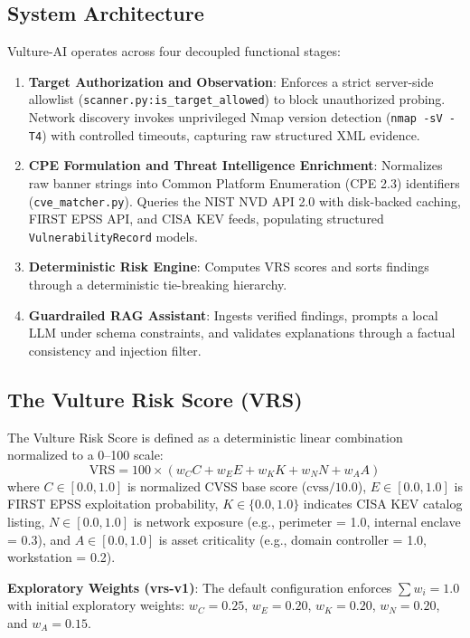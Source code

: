 \documentclass[conference]{IEEEtran}
\begin{document}
\subsection{System Architecture}
Vulture-AI operates across four decoupled functional stages:
\begin{enumerate}
    \item \textbf{Target Authorization and Observation}: Enforces a strict server-side allowlist (\texttt{scanner.py:is\_target\_allowed}) to block unauthorized probing. Network discovery invokes unprivileged Nmap version detection (\texttt{nmap -sV -T4}) with controlled timeouts, capturing raw structured XML evidence.
    \item \textbf{CPE Formulation and Threat Intelligence Enrichment}: Normalizes raw banner strings into Common Platform Enumeration (CPE 2.3) identifiers (\texttt{cve\_matcher.py}). Queries the NIST NVD API 2.0 with disk-backed caching, FIRST EPSS API, and CISA KEV feeds, populating structured \texttt{VulnerabilityRecord} models.
    \item \textbf{Deterministic Risk Engine}: Computes VRS scores and sorts findings through a deterministic tie-breaking hierarchy.
    \item \textbf{Guardrailed RAG Assistant}: Ingests verified findings, prompts a local LLM under schema constraints, and validates explanations through a factual consistency and injection filter.
\end{enumerate}

\subsection{The Vulture Risk Score (VRS)}
The Vulture Risk Score is defined as a deterministic linear combination normalized to a 0--100 scale:
\begin{equation}
\text{VRS} = 100 \times \left( w_C C + w_E E + w_K K + w_N N + w_A A \right)
\label{eq:vrs}
\end{equation}
where $C \in [0.0, 1.0]$ is normalized CVSS base score ($\text{cvss} / 10.0$), $E \in [0.0, 1.0]$ is FIRST EPSS exploitation probability, $K \in \{0.0, 1.0\}$ indicates CISA KEV catalog listing, $N \in [0.0, 1.0]$ is network exposure (e.g., perimeter = 1.0, internal enclave = 0.3), and $A \in [0.0, 1.0]$ is asset criticality (e.g., domain controller = 1.0, workstation = 0.2).

\textbf{Exploratory Weights (vrs-v1)}: The default configuration enforces $\sum w_i = 1.0$ with initial exploratory weights: $w_C = 0.25$, $w_E = 0.20$, $w_K = 0.20$, $w_N = 0.20$, and $w_A = 0.15$.
\end{document}
